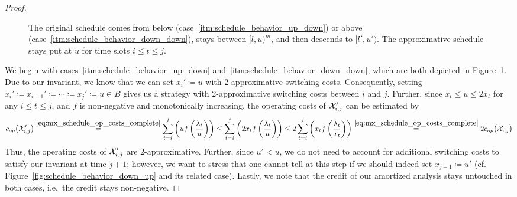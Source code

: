 \begin{proof}
\begin{figure}[ht]
\captionsetup[subfigure]{labelformat=empty}
\begin{subfigure}[b]{0.49\textwidth}

\end{subfigure}
\hfill
\begin{subfigure}[b]{0.49\textwidth}

\end{subfigure}
\caption{The original schedule comes from below (case~\ref{itm:schedule_behavior_up_down}) or above (case~\ref{itm:schedule_behavior_down_down}), stays between $[l,u)^m$, and then descends to $[l',u')$. The approximative schedule stays put at $u$ for time slots $i\le t\le j$.}
\label{fig:schedule_behavior_down}
\end{figure}
We begin with cases~\ref{itm:schedule_behavior_up_down} and~\ref{itm:schedule_behavior_down_down}, which are both depicted in Figure~\ref{fig:schedule_behavior_down}.
Due to our invariant, we know that we can set $x_i'\coloneqq u$ with 2-approximative switching costs. Consequently, setting $x_i'\coloneqq x_{i+1}'\coloneqq\dotsb\coloneqq x_j'\coloneqq u\in B$ gives us a strategy with 2-approximative switching costs between $i$ and $j$. Further, since $x_t\le u\le2x_t$ for any $i\le t\le j$, and $f$ is non-negative and monotonically increasing, the operating costs of $\mathcal{X}'_{i,j}$ can be estimated by
\begin{equation*}
	c_{op}\bigl(\mathcal{X}_{i,j}'\bigr)\stackrel{\eqref{eq:mx_schedule_op_costs_complete}}{=}\sum\limits_{t=i}^j\left(uf\left(\frac{\lambda_t}{u}\right)\right)\le\sum\limits_{t=i}^j\left(2x_tf\left(\frac{\lambda_t}{u}\right)\right)\le2\sum\limits_{t=i}^j\left(x_tf\left(\frac{\lambda_t}{x_t}\right)\right)\stackrel{\eqref{eq:mx_schedule_op_costs_complete}}{=}2c_{op}\bigl(\mathcal{X}_{i,j}\bigr)
\end{equation*}
Thus, the operating costs of $\mathcal{X}_{i,j}'$ are 2-approximative. Further, since $u'<u$, we do not need to account for additional switching costs to satisfy our invariant at time $j+1$; however, we want to stress that one cannot tell at this step if we should indeed set $x_{j+1}\coloneqq u'$ (cf. Figure~\ref{fig:schedule_behavior_down_up} and its related case). Lastly, we note that the credit of our amortized analysis stays untouched in both cases, i.e.\ the credit stays non-negative.
	

\end{proof}
